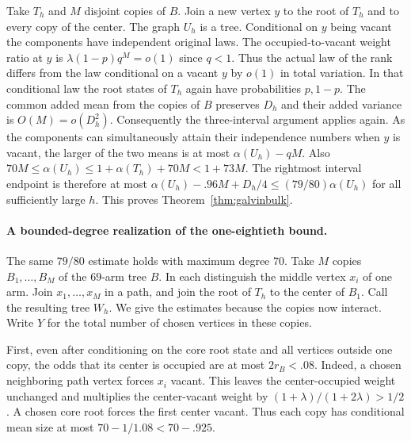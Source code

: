 \documentclass[11pt,a4paper]{article}
\numberwithin{equation}{section}
\begin{document}
Take $T_h$ and $M$ disjoint copies of $B$. Join a new vertex $y$ to
the root of $T_h$ and to every copy of the center. The graph $U_h$ is a tree.
Conditional on $y$ being vacant the components have independent original
laws. The occupied-to-vacant weight ratio at $y$ is
$\lambda(1-p)q^M=o(1)$ since $q<1$. Thus the actual law of the rank
differs from the law conditional on a vacant $y$ by $o(1)$ in total
variation. In that conditional law the root states of $T_h$ again have
probabilities $p,1-p$. The common added mean from the copies of $B$
preserves $D_h$ and their added variance is $O(M)=o(D_h^2)$.
Consequently the three-interval argument applies again.
As the components can simultaneously attain their independence numbers
when $y$ is vacant, the larger of the two means is at most
$\alpha(U_h)-qM$. Also
$70M\le\alpha(U_h)\le1+\alpha(T_h)+70M<1+73M$.
The rightmost interval endpoint is therefore at most
$\alpha(U_h)-.96M+D_h/4\le(79/80)\alpha(U_h)$ for all sufficiently
large $h$. This proves Theorem~\ref{thm:galvinbulk}.


\paragraph{A bounded-degree realization of the one-eightieth bound.}
The same $79/80$ estimate holds with maximum degree $70$.
Take $M$ copies $B_1,\ldots,B_M$ of the $69$-arm tree $B$. In each
distinguish the middle vertex $x_i$ of one arm. Join $x_1,\ldots,x_M$
in a path, and join the root of $T_h$ to the center of $B_1$.
Call the resulting tree $W_h$. We give the estimates because the copies
now interact. Write $Y$ for the total number of chosen vertices in these copies.

First, even after conditioning on the core root state and all vertices
outside one copy, the odds that its center is occupied are at most
$2r_B<.08$. Indeed, a chosen neighboring path vertex forces $x_i$
vacant. This leaves the center-occupied weight unchanged and multiplies
the center-vacant weight by $(1+\lambda)/(1+2\lambda)>1/2$.
A chosen core root forces the first center vacant. Thus each copy has
conditional mean size at most $70-1/1.08<70-.925$.
\end{document}
